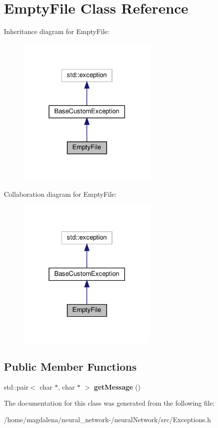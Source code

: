 \hypertarget{classEmptyFile}{}\section{Empty\+File Class Reference}
\label{classEmptyFile}


Inheritance diagram for Empty\+File\+:
\nopagebreak
\begin{figure}[H]
\begin{center}
\leavevmode
\includegraphics[width=197pt]{classEmptyFile__inherit__graph}
\end{center}
\end{figure}


Collaboration diagram for Empty\+File\+:
\nopagebreak
\begin{figure}[H]
\begin{center}
\leavevmode
\includegraphics[width=197pt]{classEmptyFile__coll__graph}
\end{center}
\end{figure}
\subsection*{Public Member Functions}
\begin{DoxyCompactItemize}
\item 
\mbox{\label{classEmptyFile_a94936a247d17ffd19005a191aa9f2a11}} 
std\+::pair$<$ char $\ast$, char $\ast$ $>$ {\bfseries get\+Message} ()
\end{DoxyCompactItemize}


The documentation for this class was generated from the following file\+:\begin{DoxyCompactItemize}
\item 
/home/magdalena/neural\+\_\+network-\//neural\+Network/src/Exceptions.\+h\end{DoxyCompactItemize}
